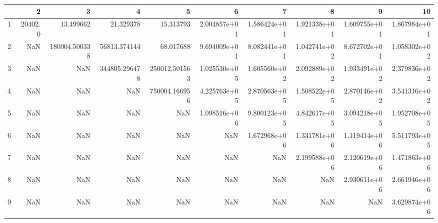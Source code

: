 \begin{tabular}{lrrrrrrrrr}
\toprule
{} &       2  &             3  &             4  &             5  &            6  &            7  &            8  &            9  &            10 \\
\midrule
1 &  20402.0 &      13.499662 &      21.329378 &      15.313793 &  2.004857e+01 &  1.586424e+01 &  1.921338e+01 &  1.609755e+01 &  1.867984e+01 \\
2 &      NaN &  180004.500338 &   56813.374144 &      68.017688 &  9.694009e+01 &  8.082441e+01 &  1.042741e+02 &  8.672702e+01 &  1.058302e+02 \\
3 &      NaN &            NaN &  344805.296478 &  250012.501563 &  1.025530e+05 &  1.605560e+02 &  2.092889e+02 &  1.933491e+02 &  2.379836e+02 \\
4 &      NaN &            NaN &            NaN &  750004.166956 &  4.225763e+05 &  2.870563e+05 &  1.508522e+05 &  2.870146e+02 &  3.541316e+02 \\
5 &      NaN &            NaN &            NaN &            NaN &  1.098516e+06 &  9.800123e+05 &  4.842617e+05 &  3.094218e+05 &  1.952708e+05 \\
6 &      NaN &            NaN &            NaN &            NaN &           NaN &  1.672968e+06 &  1.331781e+06 &  1.119414e+06 &  5.511793e+05 \\
7 &      NaN &            NaN &            NaN &            NaN &           NaN &           NaN &  2.199588e+06 &  2.120619e+06 &  1.471863e+06 \\
8 &      NaN &            NaN &            NaN &            NaN &           NaN &           NaN &           NaN &  2.930611e+06 &  2.661946e+06 \\
9 &      NaN &            NaN &            NaN &            NaN &           NaN &           NaN &           NaN &           NaN &  3.629874e+06 \\
\bottomrule
\end{tabular}
